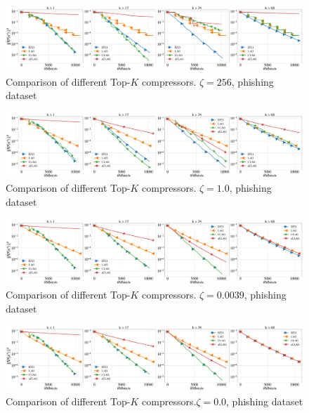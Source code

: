 \documentclass[nohyperref]{article}
\theoremstyle{plain}
\theoremstyle{definition}
\theoremstyle{remark}
\begin{document}
\newpage

\begin{figure}[!h]
	\centering
	\includegraphics[width=\textwidth]{plots/adaptive/plot_phishing_256.0.pdf}
	\caption{Comparison of different  Top-$K$ compressors. $\zeta = 256$, phishing dataset}
	\label{fig:anna-100-nodes-grads_main}
\end{figure}

\begin{figure}[!h]
	\centering
	\includegraphics[width=\textwidth]{plots/adaptive/plot_phishing_1.0.pdf}
	\caption{Comparison of different  Top-$K$ compressors. $\zeta = 1.0$, phishing dataset}
	\label{fig:anna-100-nodes-grads_main}
\end{figure}

\begin{figure}[!h]
	\centering
	\includegraphics[width=\textwidth]{plots/adaptive/plot_phishing_0.0039.pdf}
	\caption{Comparison of different  Top-$K$ compressors.  $\zeta = 0.0039$, phishing dataset}
	\label{fig:anna-100-nodes-grads_main}
\end{figure}

\begin{figure}[!h]
	\centering
	\includegraphics[width=\textwidth]{plots/adaptive/plot_phishing_0.0.pdf}
	\caption{Comparison of different  Top-$K$ compressors.$\zeta = 0.0$, phishing dataset}
	\label{fig:anna-100-nodes-grads_main}
\end{figure}






\newpage
\newpage
\appendix
\onecolumn
\end{document}
